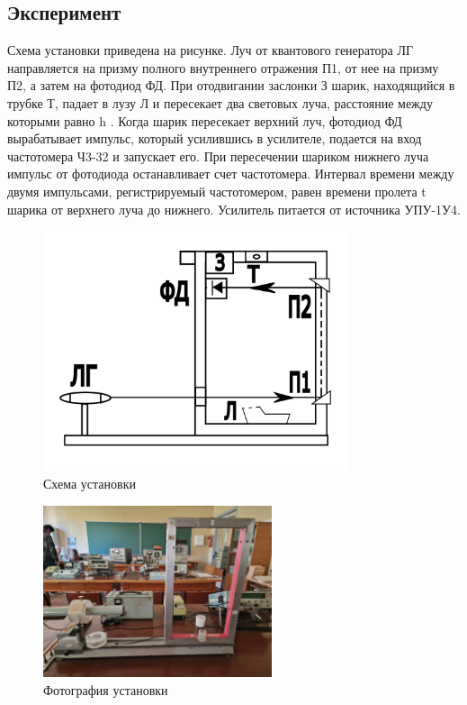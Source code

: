 \subsection{Эксперимент}
Схема установки приведена на рисунке. 
Луч от квантового генератора ЛГ направляется на призму полного внутреннего отражения П1, от нее на призму П2, а затем на фотодиод ФД. 
При отодвигании заслонки З шарик, находящийся в трубке Т, падает в лузу Л и пересекает два световых луча, расстояние между которыми равно h . Когда шарик пересекает верхний луч, фотодиод ФД вырабатывает импульс, который усилившись в усилителе, подается на вход частотомера Ч3-32 и запускает его. 
При пересечении шариком нижнего луча импульс от фотодиода останавливает счет
частотомера. 
Интервал времени между двумя импульсами, регистрируемый
частотомером, равен времени пролета t шарика от верхнего луча до нижнего. Усилитель питается от источника УПУ-1У4.

\begin{figure}[H]
\centering
\includegraphics[width=0.8\textwidth]{схема лазера.pdf}

\caption{Схема установки}
\label{fig:sketch}
\end{figure}

\begin{figure}[H]
\centering
\includegraphics[width=0.6\textwidth]{photo_2025-06-02_04-35-33.jpg}
\caption{Фотография установки}
\label{fig:device}
\end{figure}


